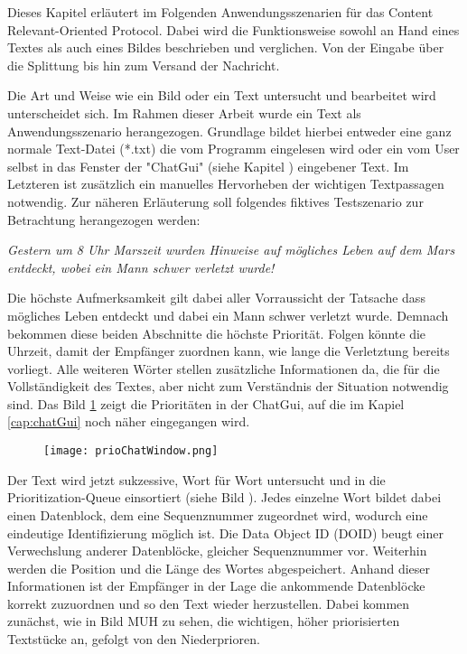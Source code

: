 Dieses Kapitel erläutert im Folgenden Anwendungsszenarien für das Content
Relevant-Oriented Protocol. Dabei wird die Funktionsweise sowohl an Hand eines
Textes als auch eines Bildes beschrieben und verglichen. Von der Eingabe über
die Splittung bis hin zum Versand der Nachricht. 

Die Art und Weise wie ein Bild oder ein Text untersucht und bearbeitet wird
unterscheidet sich. Im Rahmen dieser Arbeit wurde ein Text als
Anwendungsszenario herangezogen. Grundlage bildet hierbei entweder eine ganz
normale Text-Datei (*.txt) die vom Programm eingelesen wird oder ein vom User
selbst in das Fenster der "ChatGui" (siehe Kapitel ) eingebener Text. Im Letzteren ist zusätzlich ein manuelles Hervorheben
der wichtigen Textpassagen notwendig. Zur näheren Erläuterung soll folgendes
fiktives Testszenario zur Betrachtung herangezogen werden:

\textit{\glqq Gestern um 8 Uhr Marszeit wurden Hinweise auf mögliches Leben auf
dem Mars entdeckt, wobei ein Mann schwer verletzt wurde! \grqq}

Die höchste Aufmerksamkeit gilt dabei aller Vorraussicht der Tatsache dass
mögliches Leben entdeckt und dabei ein Mann schwer verletzt wurde. Demnach
bekommen diese beiden Abschnitte die höchste Priorität. Folgen könnte die
Uhrzeit, damit der Empfänger zuordnen kann, wie lange die Verletztung bereits
vorliegt. Alle weiteren Wörter stellen zusätzliche Informationen da, die für die
Vollständigkeit des Textes, aber nicht zum Verständnis der Situation notwendig
sind. Das Bild \ref{fig:prioChatWindow} zeigt die Prioritäten in der
ChatGui, auf die im Kapiel \ref{cap:chatGui} noch näher eingegangen wird.

\begin{figure}[H]
	\centering
	\texttt{[image: prioChatWindow.png]}
	\label{fig:prioChatWindow}
\end{figure}

Der Text wird jetzt sukzessive, Wort für Wort untersucht und in die
Prioritization-Queue einsortiert (siehe Bild ). Jedes einzelne Wort bildet dabei einen Datenblock, dem eine
Sequenznummer zugeordnet wird, wodurch eine eindeutige Identifizierung möglich
ist. Die Data Object ID (DOID) beugt einer Verwechslung anderer Datenblöcke,
gleicher Sequenznummer vor. Weiterhin werden die Position und die Länge des
Wortes abgespeichert. Anhand dieser Informationen ist der Empfänger in der Lage
die ankommende Datenblöcke korrekt zuzuordnen und so den Text wieder herzustellen.
Dabei kommen zunächst, wie in Bild MUH  zu sehen, die wichtigen, höher priorisierten Textstücke an, gefolgt
von den Niederprioren. 


